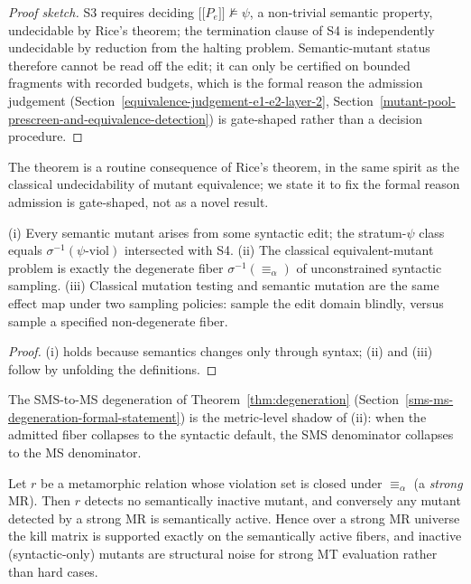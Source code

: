 \documentclass[manuscript,screen,review]{acmart}
\begin{document}
\begin{proof}[Proof sketch]
S3 requires
deciding $\mathopen{\lbrack\!\lbrack} P_e \mathclose{\rbrack\!\rbrack} \not\models \psi$, a non-trivial
semantic property, undecidable by Rice's theorem; the termination clause
of S4 is independently undecidable by reduction from the halting
problem. Semantic-mutant status therefore cannot be read off the edit;
it can only be certified on bounded fragments with recorded budgets,
which is the formal reason the admission judgement (Section~\ref{equivalence-judgement-e1-e2-layer-2}, Section~\ref{mutant-pool-prescreen-and-equivalence-detection}) is
gate-shaped rather than a decision procedure.
\end{proof}

The theorem is a routine consequence of Rice's theorem, in the same
spirit as the classical undecidability of mutant equivalence; we state
it to fix the formal reason admission is gate-shaped, not as a novel
result.

\begin{proposition}\label{prop:fiber}
(i) Every semantic mutant arises from some syntactic edit; the
stratum-$\psi$ class equals $\sigma^{-1}(\psi\text{-viol})$ intersected
with S4. (ii) The classical equivalent-mutant problem is exactly the
degenerate fiber $\sigma^{-1}(\equiv_\alpha)$ of unconstrained syntactic
sampling. (iii) Classical mutation testing and semantic mutation are the
same effect map under two sampling policies: sample the edit domain
blindly, versus sample a specified non-degenerate fiber.
\end{proposition}

\begin{proof}
(i) holds because semantics changes only through syntax; (ii) and (iii)
follow by unfolding the definitions.
\end{proof}

The SMS-to-MS degeneration of
Theorem~\ref{thm:degeneration} (Section~\ref{sms-ms-degeneration-formal-statement}) is the metric-level shadow of (ii): when the admitted
fiber collapses to the syntactic default, the SMS denominator collapses
to the MS denominator.

\begin{theorem}\label{thm:duality}
Let $r$ be a
metamorphic relation whose violation set is closed under $\equiv_\alpha$
(a \emph{strong} MR). Then $r$ detects no semantically inactive
mutant, and conversely any mutant detected by a strong MR is
semantically active. Hence over a strong MR universe the kill matrix
is supported exactly on the semantically active fibers, and inactive
(syntactic-only) mutants are structural noise for strong MT evaluation
rather than hard cases.
\end{theorem}
\end{document}
